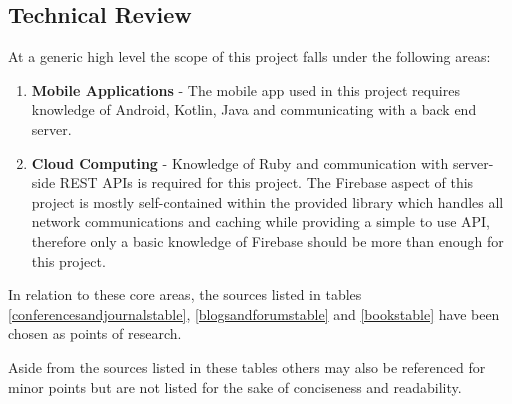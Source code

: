 \subsection{Technical Review}
\label{technicalreview}

At a generic high level the scope of this project falls under the following areas:

\begin{enumerate}
    \item \textbf{Mobile Applications} - The mobile app used in this project requires knowledge of Android, Kotlin, Java and communicating with a back end server.
    \item \textbf{Cloud Computing} - Knowledge of Ruby and communication with server-side REST APIs is required for this project. The Firebase aspect of this project is mostly self-contained within the provided library which handles all network communications and caching while providing a simple to use API, therefore only a basic knowledge of Firebase  should be more than enough for this project.
\end{enumerate}

In relation to these core areas, the sources listed in tables \ref{conferencesandjournalstable}, \ref{blogsandforumstable} and \ref{bookstable} have been chosen as points of research.

Aside from the sources listed in these tables others may also be referenced for minor points but are not listed for the sake of conciseness and readability.

